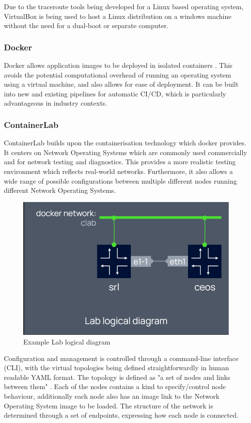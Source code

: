 Due to the traceroute tools being developed for a Linux based operating system, VirtualBox is being used to host a Linux distribution on a windows machine without the need for a dual-boot or separate computer.

\subsubsection{Docker}
Docker allows application images to be deployed in isolated containers \cite{docker_isolate}. This avoids the potential computational overhead of running an operating system using a virtual machine, and also allows for ease of deployment. It can be built into new and existing pipelines for automatic CI/CD, which is particularly advantageous in industry contexts. 

\subsubsection{ContainerLab}

ContainerLab builds upon the containerisation technology which docker provides. It centers on Network Operating Systems which are commonly used commercially and for network testing and diagnostics. This provides a more realistic testing environment which reflects real-world networks. Furthermore, it also allows a wide range of possible configurations between multiple different nodes running different Network Operating Systems.

\begin{figure}
    \centering
    \includegraphics[width=0.5\linewidth]{images/lab_logical_diagram.png}
    \caption{Example Lab logical diagram \cite{containerlab}}
    \label{fig:lab_diagram_example}
\end{figure}

Configuration and management is controlled through a command-line interface (CLI), with the virtual topologies being defined straightforwardly in human readable YAML format. The topology is defined as "a set of nodes and links between them" \cite{containerlab}. Each of the nodes contains a kind to specify/control node behaviour, additionally each node also has an image link to the Network Operating System image to be loaded. The structure of the network is determined through a set of endpoints, expressing how each node is connected.

